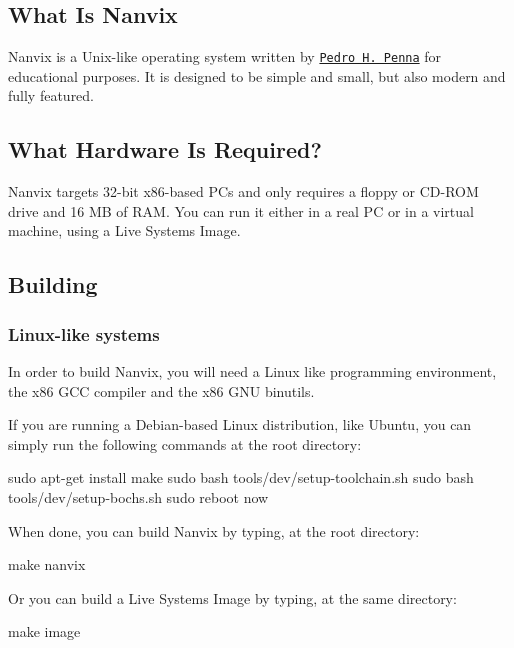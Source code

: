 \subsection*{What Is Nanvix}

Nanvix is a Unix-\/like operating system written by \href{https://github.com/ppenna}{\tt Pedro H. Penna} for educational purposes. It is designed to be simple and small, but also modern and fully featured.

\subsection*{What Hardware Is Required?}

Nanvix targets 32-\/bit x86-\/based P\+Cs and only requires a floppy or C\+D-\/\+R\+OM drive and 16 MB of R\+AM. You can run it either in a real PC or in a virtual machine, using a Live System\textquotesingle{}s Image.

\subsection*{Building}

\subsubsection*{Linux-\/like systems}

In order to build Nanvix, you will need a Linux like programming environment, the x86 G\+CC compiler and the x86 G\+NU binutils.

If you are running a Debian-\/based Linux distribution, like Ubuntu, you can simply run the following commands at the root directory\+:


\begin{DoxyCode}
sudo apt-get install make
sudo bash tools/dev/setup-toolchain.sh
sudo bash tools/dev/setup-bochs.sh
sudo reboot now
\end{DoxyCode}


When done, you can build Nanvix by typing, at the root directory\+:


\begin{DoxyCode}
make nanvix
\end{DoxyCode}


Or you can build a Live System\textquotesingle{}s Image by typing, at the same directory\+:


\begin{DoxyCode}
make image
\end{DoxyCode}


